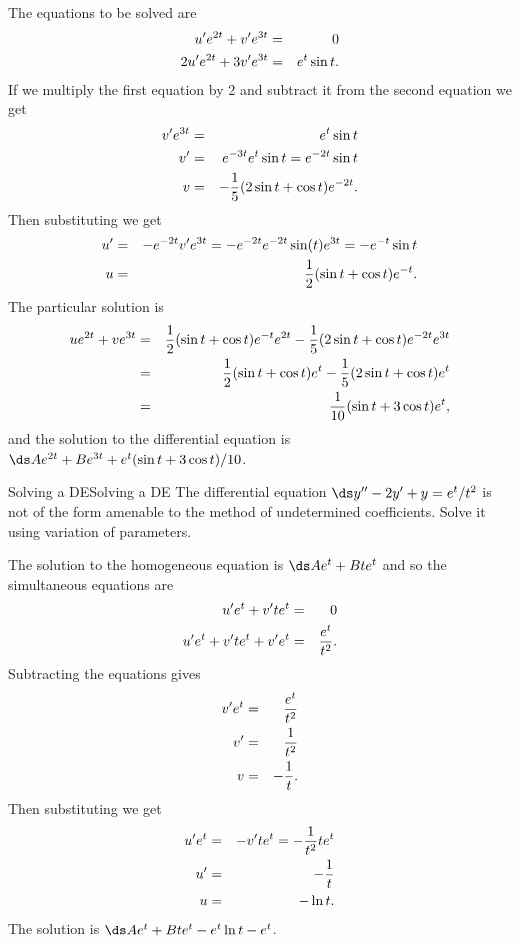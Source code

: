 \begin{solution}
The equations to be solved are 
\begin{eqnarray*}
u'e^{2t}+v'e^{3t}&=&0\cr
2u'e^{2t}+3v'e^{3t}&=&e^t\sin t.
\end{eqnarray*}
If we multiply the first equation by 2 and subtract it from the second
equation we get
\begin{eqnarray*}
v'e^{3t}&=&e^t\sin t\cr
v'&=&e^{-3t}e^t\sin t=e^{-2t}\sin t\cr
v&=&-{1\over 5}(2\sin t+\cos t)e^{-2t}.
\end{eqnarray*}
Then substituting we get
\begin{eqnarray*}
u'&=&-e^{-2t}v'e^{3t}=-e^{-2t}e^{-2t}\sin(t)e^{3t}=-e^{-t}\sin
t\cr
u&=&{1\over 2}(\sin t+\cos t)e^{-t}.
\end{eqnarray*}
The particular solution is
\begin{eqnarray*}
ue^{2t}+ve^{3t}&=&{1\over 2}(\sin t+\cos t)e^{-t}e^{2t}
-{1\over 5}(2\sin t+\cos t)e^{-2t}e^{3t}\cr
&=&{1\over 2}(\sin t+\cos t)e^t-{1\over 5}(2\sin t+\cos t)e^t\cr
&=&{1\over 10}(\sin t+3\cos t)e^t,
\end{eqnarray*}
and the solution to the differential equation is
$\ds Ae^{2t}+Be^{3t}+e^t(\sin t+3\cos t)/10$.
\end{solution}

\begin{example}{Solving a DE}{Solving a DE}\label{Solving a DE}
 The differential equation $\ds y'' -2y'+y=e^t/t^2$ is
not of the form amenable to the method of undetermined
coefficients. Solve it using variation of parameters.
\end{example}

\begin{solution}
The solution to the homogeneous equation is
$\ds Ae^t+Bte^t$ and so the simultaneous equations are
\begin{eqnarray*}
u'e^{t}+v'te^{t}&=&0\cr
u'e^{t}+v'te^{t}+v'e^t&=&{e^t\over t^2}.
\end{eqnarray*}
Subtracting the equations gives
\begin{eqnarray*}
v'e^{t}&=&{e^t\over t^2}\cr
v'&=&{1\over t^2}\cr
v&=&-{1\over t}.
\end{eqnarray*}
Then substituting we get
\begin{eqnarray*}
u'e^t&=&-v'te^t=-{1\over t^2}te^t\cr
u'&=&-{1\over t}\cr
u&=&-\ln t.
\end{eqnarray*}
The solution is $\ds Ae^t+Bte^t-e^t\ln t-e^t$.
\end{solution}


